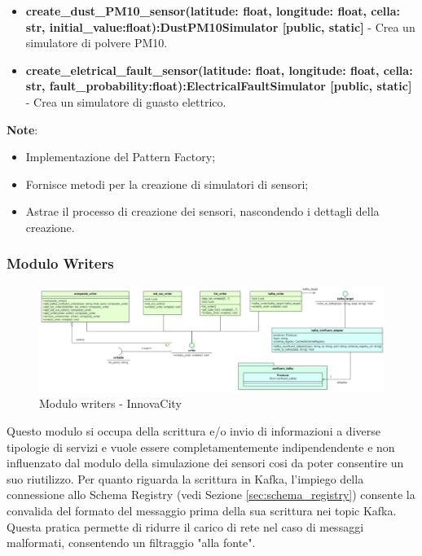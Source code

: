 \begin{itemize}
\begin{itemize}
\begin{itemize}
    \item \textbf{create\_dust\_PM10\_sensor(latitude: float, longitude: float, cella: str, initial\_value:float):DustPM10Simulator [public, static]} - Crea un simulatore di polvere PM10.
    \item \textbf{create\_eletrical\_fault\_sensor(latitude: float, longitude: float, cella: str, fault\_probability:float):ElectricalFaultSimulator [public, static]} - Crea un simulatore di guasto elettrico.
\end{itemize}
\textbf{Note}:
    \begin{itemize}
        \item Implementazione del Pattern Factory;
        \item Fornisce metodi per la creazione di simulatori di sensori;
        \item Astrae il processo di creazione dei sensori, nascondendo i dettagli della creazione.
    \end{itemize}
\end{itemize}
\end{itemize}

\subsubsection{Modulo Writers} \label{sec:writersModule}

\begin{figure}[H]
    \centering
    \includegraphics[width=1.1\textwidth]{../Images/SpecificaTecnica/writerModule.PNG}
    \caption{Modulo writers - InnovaCity}
    \label{fig: writersModule}
\end{figure}

Questo modulo si occupa della scrittura e/o invio di informazioni a diverse tipologie di servizi e vuole essere completamentemente indipendendente e non influenzato dal modulo della simulazione dei sensori cosi da poter consentire un suo riutilizzo.
Per quanto riguarda la scrittura in Kafka, l'impiego della connessione allo Schema Registry (vedi Sezione \ref{sec:schema_registry}) consente la convalida del formato del messaggio prima della sua scrittura nei topic Kafka. Questa pratica permette di ridurre il carico di rete nel caso di messaggi malformati, consentendo un filtraggio "alla fonte".

